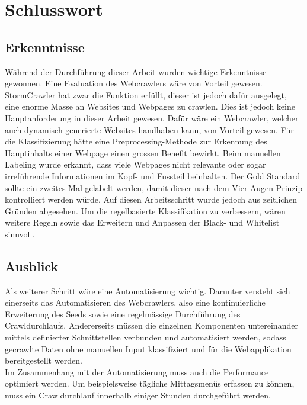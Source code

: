 \chapter{Schlusswort}
\section{Erkenntnisse}
Während der Durchführung dieser Arbeit wurden wichtige Erkenntnisse gewonnen.
Eine Evaluation des Webcrawlers wäre von Vorteil gewesen.
StormCrawler hat zwar die Funktion erfüllt, dieser ist jedoch dafür ausgelegt, eine enorme Masse an Websites und Webpages zu crawlen.
Dies ist jedoch keine Hauptanforderung in dieser Arbeit gewesen.
Dafür wäre ein Webcrawler, welcher auch dynamisch generierte Websites handhaben kann, von Vorteil gewesen.
Für die Klassifizierung hätte eine Preprocessing-Methode zur Erkennung des Hauptinhalts einer Webpage einen grossen Benefit bewirkt.
Beim manuellen Labeling wurde erkannt, dass viele Webpages nicht relevante oder sogar irreführende Informationen im Kopf- und Fussteil beinhalten.
Der Gold Standard sollte ein zweites Mal gelabelt werden, damit dieser nach dem Vier-Augen-Prinzip kontrolliert werden würde.
Auf diesen Arbeitsschritt wurde jedoch aus zeitlichen Gründen abgesehen.
Um die regelbasierte Klassifikation zu verbessern, wären weitere Regeln sowie das Erweitern und Anpassen der Black- und Whitelist sinnvoll.
\section{Ausblick}
Als weiterer Schritt wäre eine Automatisierung wichtig.
Darunter versteht sich einerseits das Automatisieren des Webcrawlers, also eine kontinuierliche Erweiterung des Seeds sowie eine regelmässige Durchführung des Crawldurchlaufs.
Andererseits müssen die einzelnen Komponenten untereinander mittels definierter Schnittstellen verbunden und automatisiert werden, sodass gecrawlte Daten ohne manuellen Input klassifiziert und für die Webapplikation bereitgestellt werden.\\
Im Zusammenhang mit der Automatisierung muss auch die Performance optimiert werden.
Um beispielsweise tägliche Mittagsmenüs erfassen zu können, muss ein Crawldurchlauf innerhalb einiger Stunden durchgeführt werden.
 

